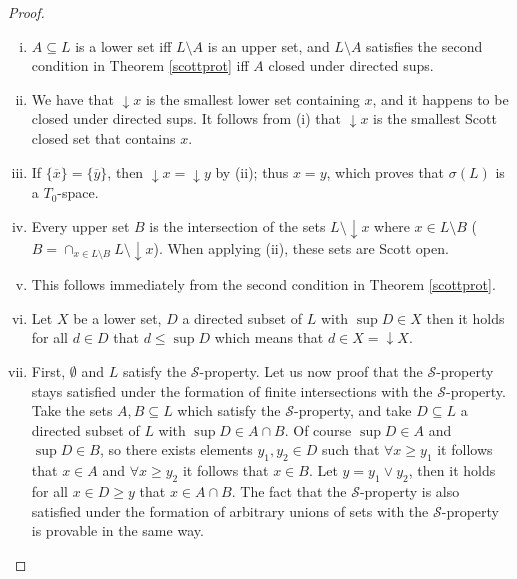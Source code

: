 \documentclass[a4paper,12pt]{article}
\theoremstyle{definition}
\begin{document}
\begin{proof}
\begin{enumerate}[(i)]
    \item $A \subseteq L$ is a lower set iff $L \setminus A$ is an upper set, and $L \setminus A$ satisfies the second condition in Theorem \ref{scottprot} iff $A$ closed under directed sups.
    \item We have that $\downarrow x$ is the smallest lower set containing $x$, and it happens to be closed under directed sups. It follows from (i) that $\downarrow x$ is the smallest Scott closed set that contains $x$.
    \item If $\{\overline{x}\} = \{\overline{y}\}$, then $\downarrow x = \downarrow y$ by (ii); thus $x = y$, which proves that $\sigma(L)$ is a $T_0$-space.
    \item Every upper set $B$ is the intersection of the sets $L \setminus \downarrow x$ where $x \in L \setminus B$ ($B = \cap_{x \in L \setminus B} L \setminus \downarrow x$). When applying (ii), these sets are Scott open.
    \item This follows immediately from the second condition in Theorem \ref{scottprot}.
    \item Let $X$ be a lower set, $D$ a directed subset of $L$ with $\sup D \in X$ then it holds for all $d \in D$ that $d \leq \sup D$ which means that $d \in X = \downarrow X$.
    \item First, $\emptyset$ and $L$ satisfy the $\mathcal{S}$-property. Let us now proof that the $\mathcal{S}$-property stays satisfied under the formation of finite intersections with the $\mathcal{S}$-property. Take the sets $A, B \subseteq L$ which satisfy the $\mathcal{S}$-property, and take $D \subseteq L$ a directed subset of $L$ with $\sup D \in A \cap B$. Of course $\sup D \in A$ and $\sup D \in B$, so there exists elements $y_1, y_2 \in D$ such that $\forall x \geq y_1$ it follows that $x \in A$ and $\forall x \geq y_2$ it follows that $x \in B$. Let $y = y_1 \vee y_2$, then it holds for all $x \in D \geq y$ that $x \in A \cap B$. The fact that the $\mathcal{S}$-property is also satisfied under the formation of arbitrary unions of sets with the $\mathcal{S}$-property is provable in the same way.
\end{enumerate}
\end{proof}
\end{document}
